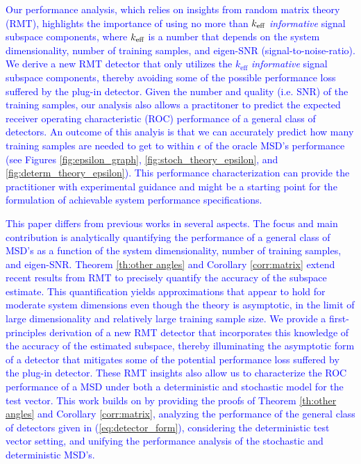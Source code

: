 \textcolor{blue}{Our performance analysis, which relies on insights from random matrix theory (RMT), highlights the importance of using no more than $k_\text{eff}$ \textit{informative} signal subspace components, where $k_\text{eff}$ is a number that depends on the system dimensionality, number of training samples, and eigen-SNR (signal-to-noise-ratio). We derive a new RMT detector that only utilizes the $k_\text{eff}$ \textit{informative} signal subspace components, thereby avoiding some of the possible performance loss suffered by the plug-in detector. Given the number and quality (i.e. SNR) of the training samples, our analysis also allows a practitoner to predict the expected receiver operating characteristic (ROC) performance of a general class of detectors. An outcome of this analyis is that we can accurately predict how many training samples are needed to get to within $\epsilon$ of the oracle MSD's performance (see Figures \ref{fig:epsilon_graph}, \ref{fig:stoch_theory_epsilon}, and \ref{fig:determ_theory_epsilon}). This performance characterization can provide the practitioner with experimental guidance and might be a starting point for the formulation of achievable system performance specifications.}

\textcolor{blue}{This paper differs from previous works in several aspects. The focus and main contribution is analytically quantifying the performance of a general class of MSD's as a function of the system dimensionality, number of training samples, and eigen-SNR. Theorem \ref{th:other angles} and Corollary \ref{corr:matrix} extend recent results from RMT \cite{paul2007asymptotics,benaych2011eigenvalues, benaych2011singular} to precisely quantify the accuracy of the subspace estimate. This quantification yields approximations that appear to hold for moderate system dimensions even though the theory is asymptotic, in the limit of large dimensionality and relatively large training sample size. We provide a first-principles derivation of a new RMT detector that incorporates this knowledge of the accuracy of the estimated subspace, thereby illuminating the asymptotic form of a detector that mitigates some of the potential performance loss suffered by the plug-in detector. These RMT insights also allow us to characterize the ROC performance of a MSD under both a deterministic and stochastic model for the test vector. This work builds on \cite{asendorf2011msd} by providing the proofs of Theorem \ref{th:other angles} and Corollary \ref{corr:matrix}, analyzing the performance of the general class of detectors given in (\ref{eq:detector_form}), considering the deterministic test vector setting, and unifying the performance analysis of the stochastic and deterministic MSD's.}

